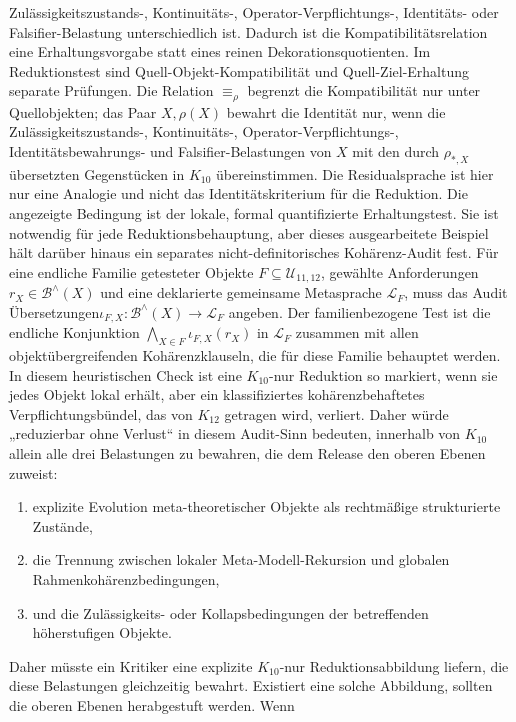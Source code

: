 Zulässigkeitszustands-, Kontinuitäts-, Operator-Verpflichtungs-, Identitäts- oder Falsifier-Belastung
unterschiedlich ist. Dadurch ist die Kompatibilitätsrelation eine Erhaltungsvorgabe statt eines reinen
Dekorationsquotienten. Im Reduktionstest sind Quell-Objekt-Kompatibilität und
Quell-Ziel-Erhaltung separate Prüfungen. Die Relation \(\equiv_{\rho}\) begrenzt die Kompatibilität nur unter
Quellobjekten; das Paar \(X,\rho(X)\) bewahrt die Identität nur, wenn die Zulässigkeitszustands-,
Kontinuitäts-, Operator-Verpflichtungs-, Identitätsbewahrungs- und Falsifier-Belastungen von \(X\) mit den
durch \(\rho_{\ast,X}\) übersetzten Gegenstücken in \(K_{10}\) übereinstimmen. Die Residualsprache ist hier
nur eine Analogie und nicht das Identitätskriterium für die Reduktion. Die angezeigte Bedingung ist der
lokale, formal quantifizierte Erhaltungstest. Sie ist notwendig für jede Reduktionsbehauptung, aber dieses
ausgearbeitete Beispiel hält darüber hinaus ein separates nicht-definitorisches Kohärenz-Audit fest. Für eine
endliche Familie getesteter Objekte \(F\subseteq\mathcal{U}_{11,12}\), gewählte Anforderungen
\(r_X\in\mathcal{B}^{\wedge}(X)\) und eine deklarierte gemeinsame Metasprache \(\mathcal{L}_F\), muss das
Audit Übersetzungen\(\iota_{F,X}:
\mathcal{B}^{\wedge}(X)\to\mathcal{L}_F\)
angeben. Der familienbezogene Test ist die endliche Konjunktion
\(\bigwedge_{X\in F}\iota_{F,X}(r_X)\) in \(\mathcal{L}_F\) zusammen mit allen
objektübergreifenden Kohärenzklauseln, die für diese Familie behauptet werden. In diesem heuristischen
Check ist eine \(K_{10}\)-nur Reduktion so markiert, wenn sie jedes Objekt lokal erhält, aber ein
klassifiziertes kohärenzbehaftetes Verpflichtungsbündel, das von \(K_{12}\) getragen wird, verliert. Daher
würde „reduzierbar ohne Verlust“ in diesem Audit-Sinn bedeuten, innerhalb von \(K_{10}\) allein alle drei
Belastungen zu bewahren, die dem Release den oberen Ebenen zuweist:
\begin{enumerate}
\item explizite Evolution meta-theoretischer Objekte als rechtmäßige strukturierte Zustände,
\item die Trennung zwischen lokaler Meta-Modell-Rekursion und globalen Rahmenkohärenzbedingungen,
\item und die Zulässigkeits- oder Kollapsbedingungen der betreffenden höherstufigen Objekte.
\end{enumerate}
Daher müsste ein Kritiker eine explizite \(K_{10}\)-nur Reduktionsabbildung liefern, die diese Belastungen
gleichzeitig bewahrt. Existiert eine solche Abbildung, sollten die oberen Ebenen herabgestuft werden. Wenn
